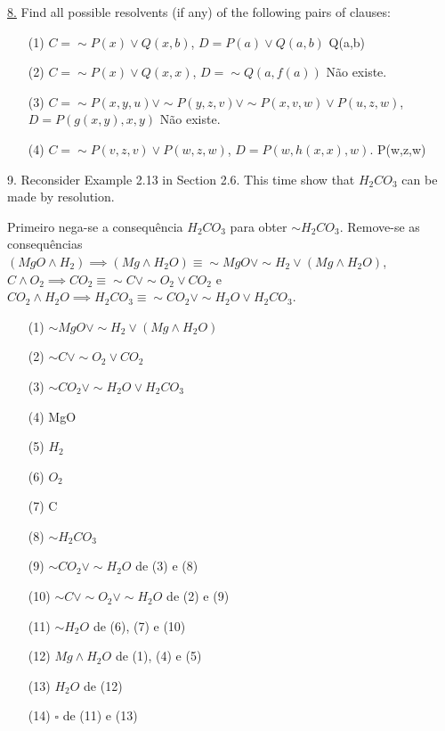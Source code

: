\underline{8.} Find all possible resolvents (if any) of the following pairs of clauses:
\begin{itemize}
 \item[(1)] $ C = \sim P(x) \vee Q(x,b) $, $ D = P(a) \vee Q(a,b) $ \newline
Q(a,b)
 \item[(2)] $ C = \sim P(x) \vee Q(x,x) $, $ D = \sim Q (a,f(a)) $ \newline
Não existe.
 \item[(3)] $ C = \sim P(x,y,u) \vee \sim P(y,z,v) \vee \sim P(x,v,w) \vee P(u,z,w) $, $ D = P(g(x,y),x,y) $ \newline
Não existe.
 \item[(4)] $ C = \sim P(v,z,v) \vee P(w,z,w) $, $ D = P(w,h(x,x),w) $. \newline
P(w,z,w)
\end{itemize}

9. Reconsider Example 2.13 in Section 2.6. This time show that $H_2CO_3$ can be made by resolution.

Primeiro nega-se a consequência $H_2CO_3$ para obter $ \sim H_2CO_3 $. Remove-se as consequências $ (MgO \wedge H_2) \implies (Mg \wedge H_2O) \equiv \sim MgO \vee \sim H_2 \vee (Mg \wedge H_2O)$, $ C \wedge O_2 \implies CO_2 \equiv \sim C \vee \sim O_2 \vee CO_2$ e $ CO_2 \wedge H_2O \implies H_2CO_3 \equiv \sim CO_2 \vee \sim H_2O \vee H_2CO_3$.

\begin{itemize}
 \item[(1)] $ \sim MgO \vee \sim H_2 \vee (Mg \wedge H_2O) $
 \item[(2)] $ \sim C \vee \sim O_2 \vee CO_2 $
 \item[(3)] $ \sim CO_2 \vee \sim H_2O \vee H_2CO_3 $
 \item[(4)] MgO
 \item[(5)] $ H_2 $
 \item[(6)] $ O_2 $
 \item[(7)] C
 \item[(8)] $ \sim H_2CO_3 $
 \item[(9)] $ \sim CO_2 \vee \sim H_2O $ de (3) e (8)
 \item[(10)] $ \sim C \vee \sim O_2 \vee \sim H_2O $ de (2) e (9)
 \item[(11)] $ \sim H_2O $ de (6), (7) e (10)
 \item[(12)] $ Mg \wedge H_2O $ de (1), (4) e (5)
 \item[(13)] $ H_2O $ de (12)
 \item[(14)] $ \square $ de (11) e (13)
\end{itemize}

